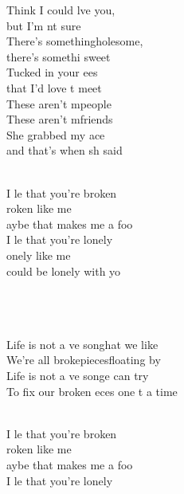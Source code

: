 \begin{cancion}[Broken][lovelytheband]
	Think I could lve you, \\
	but I’m nt sure\\
	There’s somethingholesome, \\
	there’s somethi sweet\\
	Tucked in your ees \\
	that I’d love t meet\\
\jump
	These aren’t mpeople\\
	These aren’t mfriends\\
	She grabbed my ace \\
	and that’s when sh said\\\jump\\
	\begin{chorus}%
	I le that you’re broken\\
	roken like me\\
	aybe that makes me a foo\\
	I le that you’re lonely\\
	onely like me\\
	 could be lonely with yo\\
	\end{chorus}%
	\jump\\
{}\vspace*{-0.4cm}\\
	      \\
	Life is not a ve songhat we like\\
	We’re all brokepiecesfloating by\\
	Life is not a ve songe can try\\
	To fix our broken eces one t a time\\\jump\\
	\begin{chorus}%
	I le that you’re broken\\
	roken like me\\
	aybe that makes me a foo\\
	I le that you’re lonely\\

\end{chorus}
\end{cancion}
